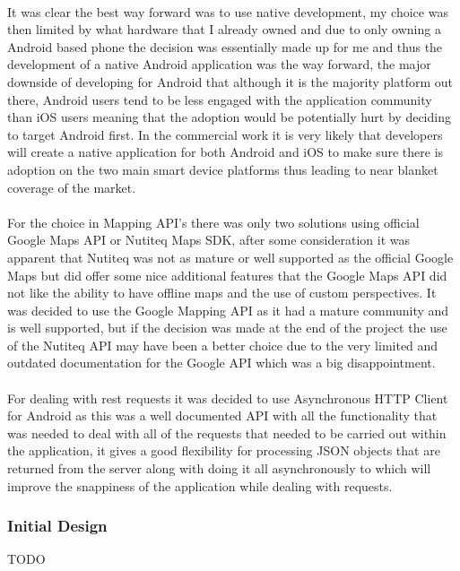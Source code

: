 \\
It was clear the best way forward was to use native development, my choice was then limited by what hardware that I already owned and due to only owning a Android based phone the decision was essentially made up for me and thus the development of a native Android application was the way forward, the major downside of developing for Android that although it is the majority platform out there, Android users tend to be less engaged with the application community than iOS users meaning that the adoption would be potentially hurt by deciding to target Android first. In the commercial work it is very likely that developers will create a native application for both Android and iOS to make sure there is adoption on the two main smart device platforms thus leading to near blanket coverage of the market.\\
\\
For the choice in Mapping API's there was only two solutions using official Google Maps API or Nutiteq Maps SDK, after some consideration it was apparent that Nutiteq was not as mature or well supported as the official Google Maps but did offer some nice additional features that the Google Maps API did not like the ability to have offline maps and the use of custom perspectives. It was decided to use the Google Mapping API as it had a mature community and is well supported, but if the decision was made at the end of the project the use of the Nutiteq API may have been a better choice due to the very limited and outdated documentation for the Google API which was a big disappointment.\\
\\
For dealing with rest requests it was decided to use Asynchronous HTTP Client for Android \cite{nknj:AndroidAsynchronousHttpClientloopjandthePersistentCookieStore:2013:online} as this was a well documented API with all the functionality that was needed to deal with all of the requests that needed to be carried out within the application, it gives a good flexibility for processing JSON objects that are returned from the server along with doing it all asynchronously to which will improve the snappiness of the application while dealing with requests.\\

\subsubsection*{Initial Design}

{TODO}

